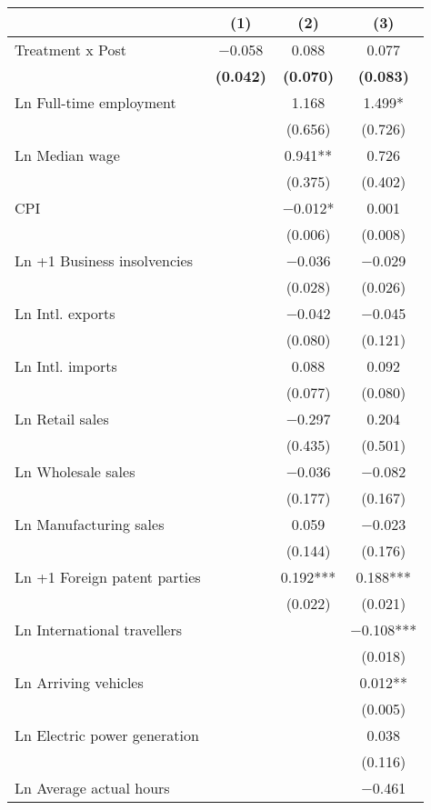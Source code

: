 
\begin{tabular}[t]{lccc}
\toprule
  & (1) & (2) & (3)\\
\midrule
Treatment x Post & \num{-0.058} & \num{0.088} & \num{0.077}\\
\textbf{} & \textbf{(\num{0.042})} & \textbf{(\num{0.070})} & \textbf{(\num{0.083})}\\
Ln Full-time employment &  & \num{1.168} & \num{1.499}*\\
 &  & (\num{0.656}) & (\num{0.726})\\
Ln Median wage &  & \num{0.941}** & \num{0.726}\\
 &  & (\num{0.375}) & (\num{0.402})\\
CPI &  & \num{-0.012}* & \num{0.001}\\
 &  & (\num{0.006}) & (\num{0.008})\\
Ln +1 Business insolvencies &  & \num{-0.036} & \num{-0.029}\\
 &  & (\num{0.028}) & (\num{0.026})\\
Ln Intl. exports &  & \num{-0.042} & \num{-0.045}\\
 &  & (\num{0.080}) & (\num{0.121})\\
Ln Intl. imports &  & \num{0.088} & \num{0.092}\\
 &  & (\num{0.077}) & (\num{0.080})\\
Ln Retail sales &  & \num{-0.297} & \num{0.204}\\
 &  & (\num{0.435}) & (\num{0.501})\\
Ln Wholesale sales &  & \num{-0.036} & \num{-0.082}\\
 &  & (\num{0.177}) & (\num{0.167})\\
Ln Manufacturing sales &  & \num{0.059} & \num{-0.023}\\
 &  & (\num{0.144}) & (\num{0.176})\\
Ln +1 Foreign patent parties &  & \num{0.192}*** & \num{0.188}***\\
 &  & (\num{0.022}) & (\num{0.021})\\
Ln International travellers &  &  & \num{-0.108}***\\
 &  &  & (\num{0.018})\\
Ln Arriving vehicles &  &  & \num{0.012}**\\
 &  &  & (\num{0.005})\\
Ln Electric power generation &  &  & \num{0.038}\\
 &  &  & (\num{0.116})\\
Ln Average actual hours &  &  & \num{-0.461}\\

\end{tabular}
